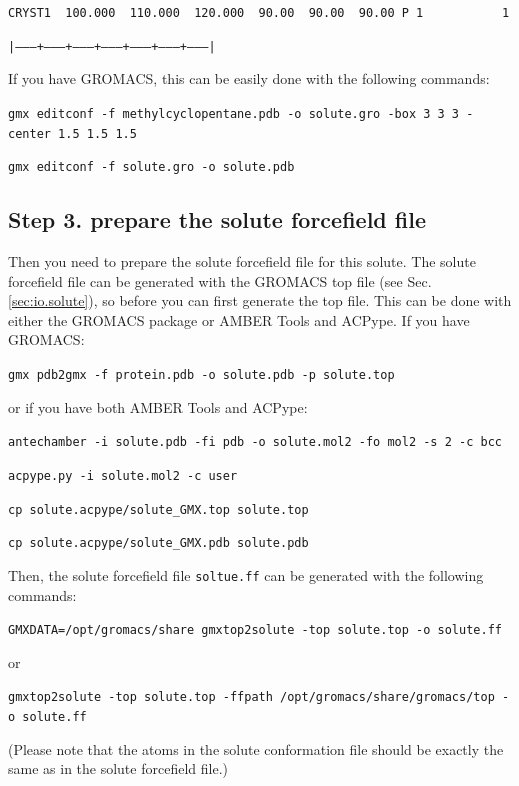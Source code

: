 \documentclass[aip,amsmath,amssymb,reprint,onecolumn]{revtex4-1}
\begin{document}
\texttt{\color{navyblue}\small CRYST1\ \ 100.000\ \ 110.000\ \ 120.000\ \ 90.00\ \ 90.00\ \ 90.00\ P\ 1\ \ \ \ \ \ \ \ \ \ \ 1}

\texttt{\color[rgb]{0.7,0.7,0.7}\small |--------+---------+---------+---------+---------+---------+---------|}

If you have GROMACS, this can be easily done with the following commands:

\texttt{\color{blue}\small gmx editconf -f methylcyclopentane.pdb -o solute.gro -box 3 3 3 -center 1.5 1.5 1.5}

\texttt{\color{blue}\small gmx editconf -f solute.gro -o solute.pdb}


\subsection*{Step 3. prepare the solute forcefield file}

Then you need to prepare the solute forcefield file for this solute. The solute forcefield file can be generated with the GROMACS top file (see Sec. \ref{sec:io.solute}), so before you can first generate the top file. This can be done with either the GROMACS package or AMBER Tools and ACPype. If you have GROMACS:

\texttt{\color{blue}\small gmx pdb2gmx -f protein.pdb -o solute.pdb -p solute.top}

or if you have both AMBER Tools and ACPype:

\texttt{\color{blue}\small antechamber -i solute.pdb -fi pdb -o solute.mol2 -fo mol2 -s 2 -c bcc}

\texttt{\color{blue}\small acpype.py -i solute.mol2 -c user}

\texttt{\color{blue}\small cp solute.acpype/solute\_GMX.top solute.top}

\texttt{\color{blue}\small cp solute.acpype/solute\_GMX.pdb solute.pdb}

Then, the solute forcefield file \texttt{soltue.ff} can be generated with the following commands:

\texttt{\color{blue}\small GMXDATA=/opt/gromacs/share gmxtop2solute -top solute.top -o solute.ff}

or

\texttt{\color{blue}\small gmxtop2solute -top solute.top -ffpath /opt/gromacs/share/gromacs/top -o solute.ff}

(Please note that the atoms in the solute conformation file should be exactly the same as in the solute forcefield file.)
\end{document}
